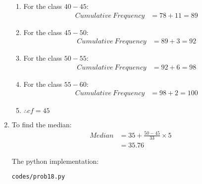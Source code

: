 \begin{enumerate}
\begin{enumerate}
\item For the class $40-45$:
\begin{align*}
Cumulative\ Frequency &= 78 + 11 = 89
\end{align*}

\item For the class $45-50$:
\begin{align*}
Cumulative\ Frequency &= 89 + 3 = 92
\end{align*}

\item For the class $50-55$:
\begin{align*}
Cumulative\ Frequency &= 92 + 6 = 98
\end{align*}

\item For the class $55-60$:
\begin{align*}
Cumulative\ Frequency &= 98 + 2 = 100
\end{align*}

\item $\therefore cf = 45 $
\end{enumerate}

\item To find the median:
\begin{align*}
Median &= 35 + \frac{50 - 45}{33} \times 5\\
&= 35.76
\end{align*}

The python implementation:
\begin{lstlisting}
codes/prob18.py
\end{lstlisting}

\end{enumerate}
